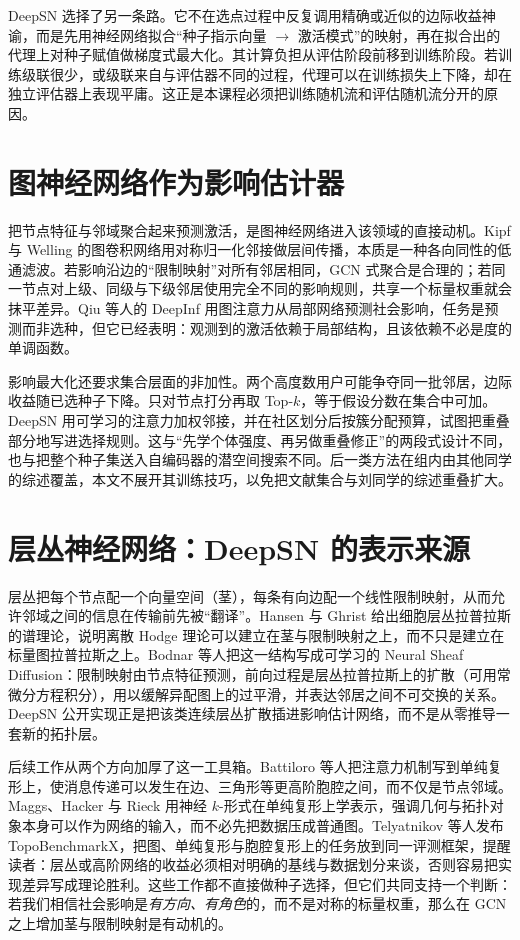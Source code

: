 \documentclass[a4paper,11pt,twocolumn]{ctexart}
\begin{document}
DeepSN 选择了另一条路。它不在选点过程中反复调用精确或近似的边际收益神谕，而是先用神经网络拟合“种子指示向量 $\to$ 激活模式”的映射，再在拟合出的代理上对种子赋值做梯度式最大化。其计算负担从评估阶段前移到训练阶段。若训练级联很少，或级联来自与评估器不同的过程，代理可以在训练损失上下降，却在独立评估器上表现平庸。这正是本课程必须把训练随机流和评估随机流分开的原因。

\section{图神经网络作为影响估计器}

把节点特征与邻域聚合起来预测激活，是图神经网络进入该领域的直接动机。Kipf 与 Welling 的图卷积网络用对称归一化邻接做层间传播，本质是一种各向同性的低通滤波\cite{kipf}。若影响沿边的“限制映射”对所有邻居相同，GCN 式聚合是合理的；若同一节点对上级、同级与下级邻居使用完全不同的影响规则，共享一个标量权重就会抹平差异。Qiu 等人的 DeepInf 用图注意力从局部网络预测社会影响，任务是预测而非选种，但它已经表明：观测到的激活依赖于局部结构，且该依赖不必是度的单调函数\cite{deepinf}。

影响最大化还要求集合层面的非加性。两个高度数用户可能争夺同一批邻居，边际收益随已选种子下降。只对节点打分再取 Top-$k$，等于假设分数在集合中可加。DeepSN 用可学习的注意力加权邻接，并在社区划分后按簇分配预算，试图把重叠部分地写进选择规则。这与“先学个体强度、再另做重叠修正”的两段式设计不同，也与把整个种子集送入自编码器的潜空间搜索不同。后一类方法在组内由其他同学的综述覆盖，本文不展开其训练技巧，以免把文献集合与刘同学的综述重叠扩大。

\section{层丛神经网络：DeepSN 的表示来源}

层丛把每个节点配一个向量空间（茎），每条有向边配一个线性限制映射，从而允许邻域之间的信息在传输前先被“翻译”。Hansen 与 Ghrist 给出细胞层丛拉普拉斯的谱理论，说明离散 Hodge 理论可以建立在茎与限制映射之上，而不只是建立在标量图拉普拉斯之上\cite{hansen}。Bodnar 等人把这一结构写成可学习的 Neural Sheaf Diffusion：限制映射由节点特征预测，前向过程是层丛拉普拉斯上的扩散（可用常微分方程积分），用以缓解异配图上的过平滑，并表达邻居之间不可交换的关系\cite{bodnar}。DeepSN 公开实现正是把该类连续层丛扩散插进影响估计网络，而不是从零推导一套新的拓扑层。

后续工作从两个方向加厚了这一工具箱。Battiloro 等人把注意力机制写到单纯复形上，使消息传递可以发生在边、三角形等更高阶胞腔之间，而不仅是节点邻域\cite{battiloro}。Maggs、Hacker 与 Rieck 用神经 $k$-形式在单纯复形上学表示，强调几何与拓扑对象本身可以作为网络的输入，而不必先把数据压成普通图\cite{maggs}。Telyatnikov 等人发布 TopoBenchmarkX，把图、单纯复形与胞腔复形上的任务放到同一评测框架，提醒读者：层丛或高阶网络的收益必须相对明确的基线与数据划分来谈，否则容易把实现差异写成理论胜利\cite{topobench}。这些工作都不直接做种子选择，但它们共同支持一个判断：若我们相信社会影响是\emph{有方向、有角色}的，而不是对称的标量权重，那么在 GCN 之上增加茎与限制映射是有动机的。
\end{document}

